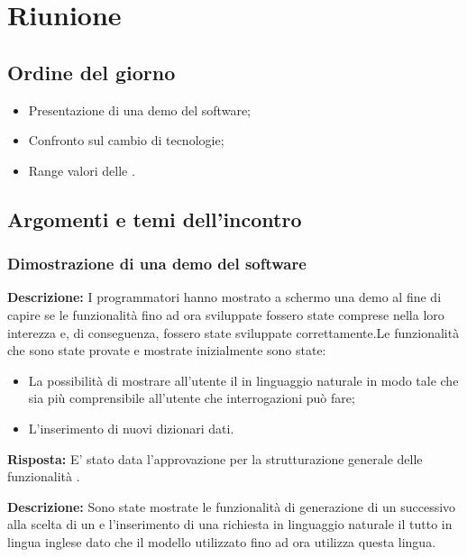 \section{Riunione}
\subsection{Ordine del giorno}
\begin{itemize}
	\item Presentazione di una demo del software;
	\item Confronto sul cambio di tecnologie;
	\item Range valori delle .
\end{itemize}

\subsection{Argomenti e temi dell'incontro}

\subsubsection{Dimostrazione di una demo del software}

\par \textbf{Descrizione:} I programmatori hanno mostrato a schermo una demo al fine di capire se le funzionalità fino ad ora sviluppate fossero state comprese nella loro interezza e, di conseguenza, fossero state sviluppate correttamente.Le funzionalità che sono state provate e mostrate inizialmente sono state: 
\begin{itemize}
	\item La possibilità di mostrare all'utente il  in linguaggio naturale in modo tale che sia più comprensibile all’utente che interrogazioni può fare;
	\item L’inserimento di nuovi dizionari dati.
	
\end{itemize}

\par \textbf{Risposta:} E’ stato data l’approvazione per la strutturazione generale delle funzionalità .

\par \textbf{Descrizione:} Sono state mostrate le funzionalità di generazione di un  successivo alla scelta di un  e l’inserimento di una richiesta in linguaggio naturale il tutto in lingua inglese dato che il modello utilizzato fino ad ora utilizza questa lingua.


